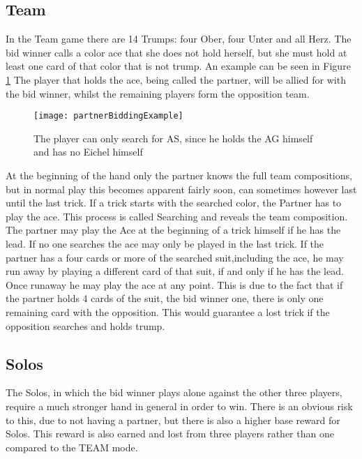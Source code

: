 \subsection{Team}
In the Team game there are 14 Trumps: four Ober, four Unter and all Herz.
\newline
The bid winner calls a color ace that she does not hold herself, but she must hold at least one card of that color
that is not trump.
An example can be seen in Figure \ref{fig:bidding}
The player that holds the ace, being called the partner, will be allied for with the bid winner, whilst the remaining
players form the opposition team.
\newline
\begin{figure}[h!]
    \texttt{[image: partnerBiddingExample]}\label{fig:figure}
    \caption{The player can only search for AS, since he holds the AG himself and has no Eichel himself}
    \label{fig:bidding}
\end{figure}
\newline
At the beginning of the hand only the partner knows the full team compositions, but in normal play this becomes
apparent fairly soon, can sometimes however last until the last trick.
If a trick starts with the searched color, the Partner has to play the ace.
This process is called Searching and reveals the team composition.
\newline
The partner may play the Ace at the beginning of a trick himself if he has the lead.
If no one searches the ace may only be played in the last trick.
If the partner has a four cards or more of the searched suit,including the ace, he may run away by playing a different
card of that suit, if and only if he has the lead.
Once runaway he may play the ace at any point.
This is due to the fact that if the partner holds 4 cards of the suit, the bid winner one, there is only one remaining
card with the opposition.
This would guarantee a lost trick if the opposition searches and holds trump.

\subsection{Solos}
The Solos, in which the bid winner plays alone against the other three players, require a much stronger hand in general
in order to win.
There is an obvious risk to this, due to not having a partner, but there is also a higher base reward for Solos.
This reward is also earned and lost from three players rather than one compared to the TEAM mode.

